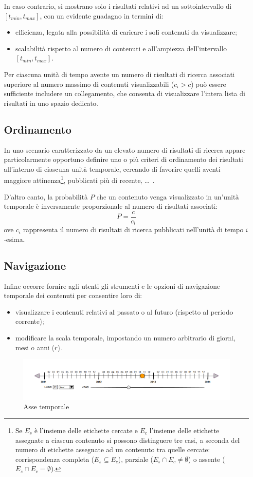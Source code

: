 In caso contrario, si mostrano solo i risultati relativi ad un sottointervallo di $[t_{min}, t_{max}]$, con un evidente guadagno in termini di:
\begin{itemize}
  \item efficienza, legata alla possibilità di caricare i soli contenuti da visualizzare;
  \item scalabilità rispetto al numero di contenuti e all'ampiezza dell'intervallo $[t_{min}, t_{max}]$.
\end{itemize}

Per ciascuna unità di tempo avente un numero di risultati di ricerca associati superiore al numero massimo di contenuti visualizzabili ($c_i > c$) può essere sufficiente includere un collegamento, che consenta di visualizzare l'intera lista di risultati in uno spazio dedicato.

\subsection{Ordinamento}
In uno scenario caratterizzato da un elevato numero di risultati di ricerca appare particolarmente opportuno definire uno o più criteri di ordinamento dei risultati all'interno di ciascuna unità temporale, cercando di favorire quelli aventi maggiore attinenza\footnote{Se $E_s$ è l'insieme delle etichette cercate e $E_c$ l'insieme delle etichette assegnate a ciascun contenuto si possono distinguere tre casi, a seconda del numero di etichette assegnate ad un contenuto tra quelle cercate: corrispondenza completa ($E_s \subseteq E_c$), parziale ($E_s \cap E_c \neq \emptyset$) o assente ($E_s \cap E_c = \emptyset$).}, pubblicati più di recente, \ldots\ .

D'altro canto, la probabilità $P$ che un contenuto venga visualizzato in un'unità temporale è inversamente proporzionale al numero di risultati associati:
\begin{equation}
P = \frac{c}{c_i}
\end{equation}
ove $c_i$ rappresenta il numero di risultati di ricerca pubblicati nell'unità di tempo $i$-esima.

\subsection{Navigazione}
Infine occorre fornire agli utenti gli strumenti e le opzioni di navigazione temporale dei contenuti per consentire loro di:
\begin{itemize}
  \item visualizzare i contenuti relativi al passato o al futuro (rispetto al periodo corrente);
  \item modificare la scala temporale, impostando un numero arbitrario di giorni, mesi o anni ($r$).
\end{itemize}

\begin{figure}[ht]
	\begin{center}
		\includegraphics[width=12cm]{img/timeline.png}
		\caption{Asse temporale}
		\label{fig:tesi:stage:design:timeline}
	\end{center}
\end{figure}